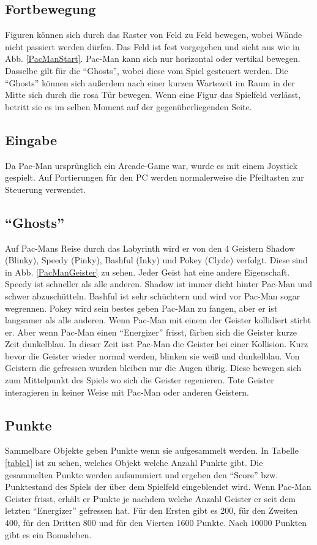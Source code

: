 \documentclass[a4paper, 11pt]{article}
\begin{document}
\subsection{Fortbewegung}
Figuren können sich durch das Raster von Feld zu Feld bewegen, wobei Wände nicht passiert werden dürfen. Das Feld ist fest vorgegeben und sieht aus wie in Abb. \ref{PacManStart}. Pac-Man kann sich nur horizontal oder vertikal bewegen. Dasselbe gilt für die "`Ghosts"', wobei diese vom Spiel gesteuert werden. Die "`Ghosts"' können sich außerdem nach einer kurzen Wartezeit im Raum in der Mitte sich durch die rosa Tür bewegen. Wenn eine Figur das Spielfeld verlässt, betritt sie es im selben Moment auf der gegenüberliegenden Seite.

\subsection{Eingabe}
Da Pac-Man ursprünglich ein Arcade-Game war, wurde es mit einem Joystick gespielt. Auf Portierungen für den PC werden normalerweise die Pfeiltasten zur Steuerung verwendet.

\subsection{"`Ghosts"'}
Auf Pac-Mans Reise durch das Labyrinth wird er von den 4 Geistern Shadow (Blinky), Speedy (Pinky), Bashful (Inky) und Pokey (Clyde) verfolgt. Diese sind in Abb. \ref{PacManGeister} zu sehen. Jeder Geist hat eine andere Eigenschaft. Speedy ist schneller als alle anderen. Shadow ist immer dicht hinter Pac-Man und schwer abzuschütteln. Bashful ist sehr schüchtern und wird vor Pac-Man sogar wegrennen. Pokey wird sein bestes geben Pac-Man zu fangen, aber er ist langsamer als alle anderen. Wenn Pac-Man mit einem der Geister kollidiert stirbt er. Aber wenn Pac-Man einen "`Energizer"' frisst, färben sich die Geister kurze Zeit dunkelblau. In dieser Zeit isst Pac-Man die Geister bei einer Kollision. Kurz bevor die Geister wieder normal werden, blinken sie weiß und dunkelblau. Von Geistern die gefressen wurden bleiben nur die Augen übrig. Diese bewegen sich zum Mittelpunkt des Spiels wo sich die Geister regenieren. Tote Geister interagieren in keiner Weise mit Pac-Man oder anderen Geistern. 

\subsection{Punkte}
Sammelbare Objekte geben Punkte wenn sie aufgesammelt werden. In Tabelle \ref{table1} ist zu sehen, welches Objekt welche Anzahl Punkte gibt. Die gesammelten Punkte werden aufsummiert und ergeben den "`Score"' bzw. Punktestand des Spiels der über dem Spielfeld eingeblendet wird. Wenn Pac-Man Geister frisst, erhält er Punkte je nachdem welche Anzahl Geister er seit dem letzten "`Energizer"' gefressen hat. Für den Ersten gibt es 200, für den Zweiten 400, für den Dritten 800 und für den Vierten 1600 Punkte. Nach $10000$ Punkten gibt es ein Bonusleben. 
\end{document}
